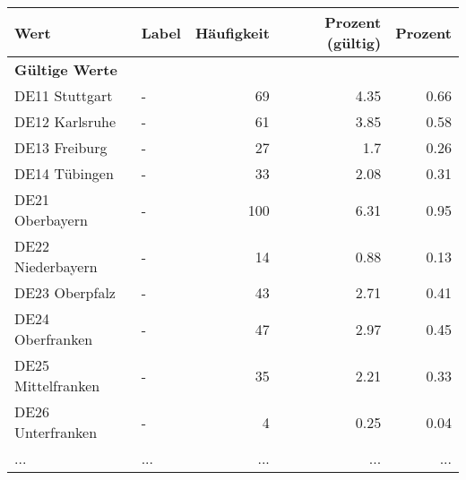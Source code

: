      \begin{longtable}{Xlrrr}
     \toprule
     \textbf{Wert} & \textbf{Label} & \textbf{Häufigkeit} & \textbf{Prozent (gültig)} & \textbf{Prozent} \\
     \endhead
     \midrule
     \multicolumn{5}{l}{\textbf{Gültige Werte}}\\
        \multicolumn{1}{X}{DE11 Stuttgart} & - & \num{69} & \num[round-mode=places,round-precision=2]{4.35} & \num[round-mode=places,round-precision=2]{0.66} \\
        \multicolumn{1}{X}{DE12 Karlsruhe} & - & \num{61} & \num[round-mode=places,round-precision=2]{3.85} & \num[round-mode=places,round-precision=2]{0.58} \\
        \multicolumn{1}{X}{DE13 Freiburg} & - & \num{27} & \num[round-mode=places,round-precision=2]{1.7} & \num[round-mode=places,round-precision=2]{0.26} \\
        \multicolumn{1}{X}{DE14 Tübingen} & - & \num{33} & \num[round-mode=places,round-precision=2]{2.08} & \num[round-mode=places,round-precision=2]{0.31} \\
        \multicolumn{1}{X}{DE21 Oberbayern} & - & \num{100} & \num[round-mode=places,round-precision=2]{6.31} & \num[round-mode=places,round-precision=2]{0.95} \\
        \multicolumn{1}{X}{DE22 Niederbayern} & - & \num{14} & \num[round-mode=places,round-precision=2]{0.88} & \num[round-mode=places,round-precision=2]{0.13} \\
        \multicolumn{1}{X}{DE23 Oberpfalz} & - & \num{43} & \num[round-mode=places,round-precision=2]{2.71} & \num[round-mode=places,round-precision=2]{0.41} \\
        \multicolumn{1}{X}{DE24 Oberfranken} & - & \num{47} & \num[round-mode=places,round-precision=2]{2.97} & \num[round-mode=places,round-precision=2]{0.45} \\
        \multicolumn{1}{X}{DE25 Mittelfranken} & - & \num{35} & \num[round-mode=places,round-precision=2]{2.21} & \num[round-mode=places,round-precision=2]{0.33} \\
        \multicolumn{1}{X}{DE26 Unterfranken} & - & \num{4} & \num[round-mode=places,round-precision=2]{0.25} & \num[round-mode=places,round-precision=2]{0.04} \\
       ... & ... & ... & ... & ... \\

\end{longtable}
